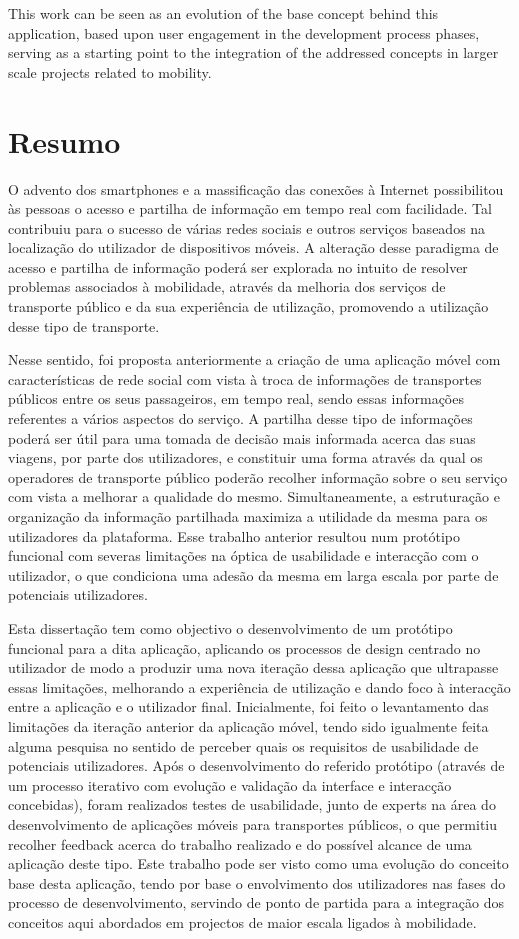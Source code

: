 This work can be seen as an evolution of the base concept behind this application, based upon user engagement in the development process phases, serving as a starting point to the integration of the addressed concepts in larger scale projects related to mobility.

\chapter*{Resumo}

O advento dos smartphones e a massificação das conexões à Internet possibilitou às pessoas o acesso e partilha de informação em tempo real com facilidade. Tal contribuiu para o sucesso de várias redes sociais e outros serviços baseados na localização do utilizador de dispositivos móveis. A alteração desse paradigma de acesso e partilha de informação poderá ser explorada no intuito de resolver problemas associados à mobilidade, através da melhoria dos serviços de transporte público e da sua experiência de utilização, promovendo a utilização desse tipo de transporte.

Nesse sentido, foi proposta anteriormente a criação de uma aplicação móvel com características de rede social com vista à troca de informações de transportes públicos entre os seus passageiros, em tempo real, sendo essas informações referentes a vários aspectos do serviço. A partilha desse tipo de informações poderá ser útil para uma tomada de decisão mais informada acerca das suas viagens, por parte dos utilizadores, e constituir uma forma através da qual os operadores de transporte público poderão recolher informação sobre o seu serviço com vista a melhorar a qualidade do mesmo. Simultaneamente, a estruturação e organização da informação partilhada maximiza a utilidade da mesma para os utilizadores da plataforma. Esse trabalho anterior resultou num protótipo funcional com severas limitações na óptica de usabilidade e interacção com o utilizador, o que condiciona uma adesão da mesma em larga escala por parte de potenciais utilizadores.

Esta dissertação tem como objectivo o desenvolvimento de um protótipo funcional para a dita aplicação, aplicando os processos de design centrado no utilizador de modo a produzir uma nova iteração dessa aplicação que ultrapasse essas limitações, melhorando a experiência de utilização e dando foco à interacção entre a aplicação e o utilizador final. Inicialmente, foi feito o levantamento das limitações da iteração anterior da aplicação móvel, tendo sido igualmente feita alguma pesquisa no sentido de perceber quais os requisitos de usabilidade de potenciais utilizadores. Após o desenvolvimento do referido protótipo (através de um processo iterativo com evolução e validação da interface e interacção concebidas), foram realizados testes de usabilidade, junto de experts na área do desenvolvimento de aplicações móveis para transportes públicos, o que permitiu recolher feedback acerca do trabalho realizado e do possível alcance de uma aplicação deste tipo. Este trabalho pode ser visto como uma evolução do conceito base desta aplicação, tendo por base o envolvimento dos utilizadores nas fases do processo de desenvolvimento, servindo de ponto de partida para a integração dos conceitos aqui abordados em projectos de maior escala ligados à mobilidade.
